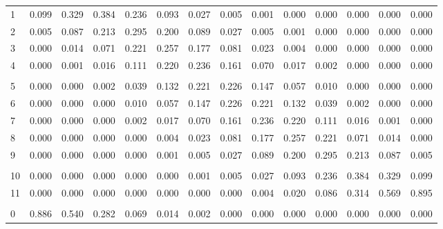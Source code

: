 \documentclass[
]{article}
\begin{document}
\begin{longtable}[t]{lrrrrrrrrrrrrr}
\hspace{1em}1 & 0.099 & 0.329 & 0.384 & 0.236 & 0.093 & 0.027 & 0.005 & 0.001 & 0.000 & 0.000 & 0.000 & 0.000 & 0.000\\
\hspace{1em}2 & 0.005 & 0.087 & 0.213 & 0.295 & 0.200 & 0.089 & 0.027 & 0.005 & 0.001 & 0.000 & 0.000 & 0.000 & 0.000\\
\hspace{1em}3 & 0.000 & 0.014 & 0.071 & 0.221 & 0.257 & 0.177 & 0.081 & 0.023 & 0.004 & 0.000 & 0.000 & 0.000 & 0.000\\
\hspace{1em}4 & 0.000 & 0.001 & 0.016 & 0.111 & 0.220 & 0.236 & 0.161 & 0.070 & 0.017 & 0.002 & 0.000 & 0.000 & 0.000\\
\addlinespace[-.7em]
\multicolumn{14}{l}{ }\\
\hspace{1em}5 & 0.000 & 0.000 & 0.002 & 0.039 & 0.132 & 0.221 & 0.226 & 0.147 & 0.057 & 0.010 & 0.000 & 0.000 & 0.000\\
\hspace{1em}6 & 0.000 & 0.000 & 0.000 & 0.010 & 0.057 & 0.147 & 0.226 & 0.221 & 0.132 & 0.039 & 0.002 & 0.000 & 0.000\\
\hspace{1em}7 & 0.000 & 0.000 & 0.000 & 0.002 & 0.017 & 0.070 & 0.161 & 0.236 & 0.220 & 0.111 & 0.016 & 0.001 & 0.000\\
\hspace{1em}8 & 0.000 & 0.000 & 0.000 & 0.000 & 0.004 & 0.023 & 0.081 & 0.177 & 0.257 & 0.221 & 0.071 & 0.014 & 0.000\\
\hspace{1em}9 & 0.000 & 0.000 & 0.000 & 0.000 & 0.001 & 0.005 & 0.027 & 0.089 & 0.200 & 0.295 & 0.213 & 0.087 & 0.005\\
\addlinespace[-.7em]
\multicolumn{14}{l}{ }\\
\hspace{1em}10 & 0.000 & 0.000 & 0.000 & 0.000 & 0.000 & 0.001 & 0.005 & 0.027 & 0.093 & 0.236 & 0.384 & 0.329 & 0.099\\
\hspace{1em}11 & 0.000 & 0.000 & 0.000 & 0.000 & 0.000 & 0.000 & 0.000 & 0.004 & 0.020 & 0.086 & 0.314 & 0.569 & 0.895\\
\addlinespace[0.3em]
\multicolumn{14}{l}{$n=12$}\\
\hspace{1em}0 & 0.886 & 0.540 & 0.282 & 0.069 & 0.014 & 0.002 & 0.000 & 0.000 & 0.000 & 0.000 & 0.000 & 0.000 & 0.000\\

\end{longtable}
\end{document}
